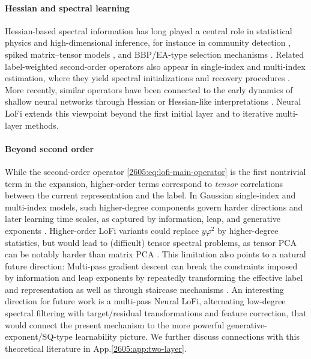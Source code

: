 \paragraph{Hessian and spectral learning}
Hessian-based spectral information has long played a central role in statistical physics and high-dimensional inference, for instance in community detection \cite{saade2014spectral}, spiked matrix--tensor models \cite{ros2019complex,mannelli2019who,mannelli2020marvels}, and BBP/EA-type  selection mechanisms \cite{baik2005phase,edwards1976eigenvalue}. Related label-weighted second-order operators also appear in single-index and multi-index estimation, where they yield spectral initializations and recovery procedures \cite{lu2020phase,mondelli2018fundamental,maillard2020phase,vilucchio2025asymptotics}. More recently, similar operators have been connected to the early dynamics of shallow neural networks through Hessian or Hessian-like interpretations \cite{bonnaire2025role,zhang2025neural,montanari2026phase,defilippis2026optimal}. Neural LoFi extends this  viewpoint beyond the first initial layer and to iterative multi-layer methods.





\paragraph{Beyond second order} While the second-order operator \eqref{2605:eq:lofi-main-operator} is  the first nontrivial term in the expansion, higher-order terms correspond to {\it tensor} correlations between the current representation and the label. In Gaussian single-index and multi-index models, such higher-degree components govern harder directions and later learning time scales, as captured by information, leap, and generative exponents \cite{arous2021online,abbe2023sgd,damian2024computational,troiani2024fundamental,damian2026generative}. Higher-order LoFi variants could replace \(y\varphi^2\) by higher-degree statistics, but would lead to (difficult) tensor spectral problems, as tensor PCA can be notably harder than matrix PCA \cite{hopkins2015tensor,lesieur2017statistical,wein2019kikuchi,arous2020algorithmic}. This limitation also points to a natural future direction: Multi-pass gradient descent can break the constraints imposed by information and leap exponents by repeatedly transforming the effective label and representation \cite{dandi2024benefits} as well as through staircase mechanisms \cite{mannelli2019who,abbe2021staircase,benarous2024stochastic,bardone2024sliding,tabanelli2025computational}.  An interesting direction for future work is a multi-pass Neural LoFi, alternating low-degree spectral filtering with target/residual transformations and feature correction, that would connect the present mechanism to the more powerful generative-exponent/SQ-type learnability picture. We further discuss  connections with this theoretical literature in App.\ref{2605:app:two-layer}.

